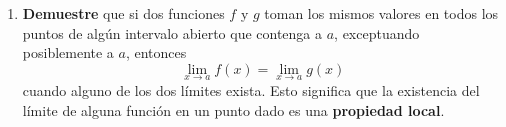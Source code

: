 \documentclass[12pt]{article}
\begin{document}
\begin{enumerate}
\begin{proof}
        De (ii): Suponga que $\lim_{ x\rightarrow t}f(x)=l$ con $l\in\mathbb{R}$. Entonces para todo $\varepsilon>0$ existe $\delta>0$ tal que
        \begin{equation*}
            x\in S\textup{ tal que }0<\abs{x-t}<\delta\Rightarrow\abs{f(x)-l}<\varepsilon
        \end{equation*}
        Si $x=t+h$ con $h\in\mathbb{R}$, esto anterior es equivalente a decir que
        \begin{equation*}
            t+h\in S\textup{ tal que }0<\abs{t+h-t}<\delta\Rightarrow\abs{f(t+h)-l}<\varepsilon
        \end{equation*}
        esto es
        \begin{equation*}
            t+h\in S\textup{ tal que }0<\abs{h}<\delta\Rightarrow\abs{f(t+h)-l}<\varepsilon
        \end{equation*}
        por la definición de límite se sigue que
        \begin{equation*}
            \lim_{ h\rightarrow 0}f(t+h)=l=\lim_{ x\rightarrow t}f(x)
        \end{equation*}
    \end{proof}

    \item \textbf{Demuestre} que si dos funciones $f$ y $g$ toman los mismos valores en todos los puntos de algún intervalo abierto que contenga a $a$, exceptuando posiblemente a $a$, entonces
    \begin{equation*}
        \lim_{ x\rightarrow a}f(x)=\lim_{ x\rightarrow a}g(x)
    \end{equation*}
    cuando alguno de los dos límites exista. Esto significa que la existencia del límite de alguna función en un punto dado es una \textbf{propiedad local}.


\end{enumerate}
\end{document}

